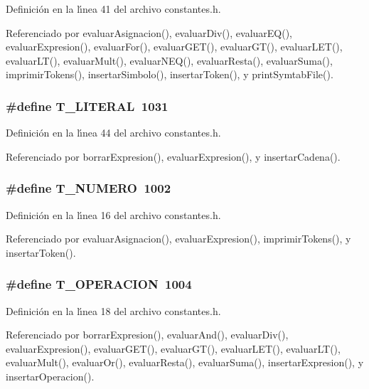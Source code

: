 Definici\'{o}n en la l\'{\i}nea 41 del archivo constantes.h.

Referenciado por evaluar\-Asignacion(), evaluar\-Div(), evaluar\-EQ(), evaluar\-Expresion(), evaluar\-For(), evaluar\-GET(), evaluar\-GT(), evaluar\-LET(), evaluar\-LT(), evaluar\-Mult(), evaluar\-NEQ(), evaluar\-Resta(), evaluar\-Suma(), imprimir\-Tokens(), insertar\-Simbolo(), insertar\-Token(), y print\-Symtab\-File().
\subsubsection{\setlength{\rightskip}{0pt plus 5cm}\#define T\_\-LITERAL~1031}\label{constantes_8h_a33}




Definici\'{o}n en la l\'{\i}nea 44 del archivo constantes.h.

Referenciado por borrar\-Expresion(), evaluar\-Expresion(), y insertar\-Cadena().
\subsubsection{\setlength{\rightskip}{0pt plus 5cm}\#define T\_\-NUMERO~1002}\label{constantes_8h_a5}




Definici\'{o}n en la l\'{\i}nea 16 del archivo constantes.h.

Referenciado por evaluar\-Asignacion(), evaluar\-Expresion(), imprimir\-Tokens(), y insertar\-Token().
\subsubsection{\setlength{\rightskip}{0pt plus 5cm}\#define T\_\-OPERACION~1004}\label{constantes_8h_a7}




Definici\'{o}n en la l\'{\i}nea 18 del archivo constantes.h.

Referenciado por borrar\-Expresion(), evaluar\-And(), evaluar\-Div(), evaluar\-Expresion(), evaluar\-GET(), evaluar\-GT(), evaluar\-LET(), evaluar\-LT(), evaluar\-Mult(), evaluar\-Or(), evaluar\-Resta(), evaluar\-Suma(), insertar\-Expresion(), y insertar\-Operacion().
